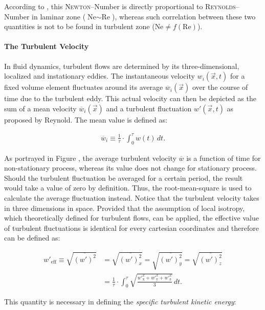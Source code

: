 According to \citet{Wollny2010Diss}, this \textsc{Newton}--Number is directly proportional to \textsc{Reynolds}--Number in laminar zone ($\text{Ne} \sim \text{Re}$), whereas such correlation between these two quantities is not to be found in turbulent zone ($\text{Ne} \neq f(\text{Re})$).

\paragraph{The Turbulent Velocity}
In fluid dynamics, turbulent flows are determined by its three-dimensional, localized and instationary eddies. The instantaneous velocity $w_i(\Vec{x},t)$ for a fixed volume element fluctuates around its average $\overline{w}_i(\Vec{x})$ over the course of time due to the turbulent eddy. This actual velocity can then be depicted as the sum of a mean velocity $\overline{w}_i(\Vec{x})$ and a turbulent fluctuation $w'(\Vec{x},t)$ as proposed by Reynold. The mean value is defined as:

\begin{gather}
    \overline{w}_i \equiv \frac{1}{\tau} \cdot \int_0^\tau w(t) \, dt.
\end{gather}

As portrayed in Figure , the average turbulent velocity $\overline{w}$ is a function of time for non-stationary process, whereas its value does not change for stationary process. Should the turbulent fluctuation be averaged for a certain period, the result would take a value of zero by definition. Thus, the root-mean-square is used to calculate the average fluctuation instead. Notice that the turbulent velocity takes in three dimensions in space. Provided that the assumption of local isotropy, which \citet{Kolmogorov} theoretically defined for turbulent flows, can be applied, the effective value of turbulent fluctuations is identical for every cartesian coordinates and therefore can be defined as:

\begin{align}
    {w'}_\text{eff} \equiv \sqrt{\overline{(w')^2}} &= \sqrt{\overline{(w')_x^2}} = \sqrt{\overline{(w')_y^2}} = \sqrt{\overline{(w')_z^2}} \nonumber \\
    &= \frac{1}{\tau} \cdot \int_0^\tau \sqrt{\frac{{w'}_\text{x}^2 + {w'}_\text{y}^2 + {w'}_\text{z}^2}{3}} \, dt.
\end{align}

This quantity is necessary in defining the \textit{specific turbulent kinetic energy}:


